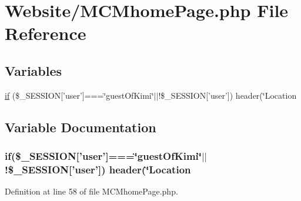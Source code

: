 \hypertarget{_m_c_mhome_page_8php}{\section{Website/\-M\-C\-Mhome\-Page.php File Reference}
\label{_m_c_mhome_page_8php}
}
\subsection*{Variables}
\begin{DoxyCompactItemize}
\item 
\hyperlink{_m_c_mhome_page_8php_a8dec719c1645067d1065f7f064d4b967}{if} (\$\-\_\-\-S\-E\-S\-S\-I\-O\-N\mbox{[}'user'\mbox{]}===\char`\"{}guest\-Of\-Kimi\char`\"{}$|$$|$!\$\-\_\-\-S\-E\-S\-S\-I\-O\-N\mbox{[}'user'\mbox{]}) header(\char`\"{}Location
\end{DoxyCompactItemize}


\subsection{Variable Documentation}
\hypertarget{_m_c_mhome_page_8php_a8dec719c1645067d1065f7f064d4b967}{
\subsubsection[{if}]{\setlength{\rightskip}{0pt plus 5cm}if(\$\-\_\-\-S\-E\-S\-S\-I\-O\-N\mbox{[}'user'\mbox{]}===\char`\"{}guest\-Of\-Kimi\char`\"{}$|$$|$!\$\-\_\-\-S\-E\-S\-S\-I\-O\-N\mbox{[}'user'\mbox{]}) header(\char`\"{}Location}}\label{_m_c_mhome_page_8php_a8dec719c1645067d1065f7f064d4b967}


Definition at line 58 of file M\-C\-Mhome\-Page.\-php.


